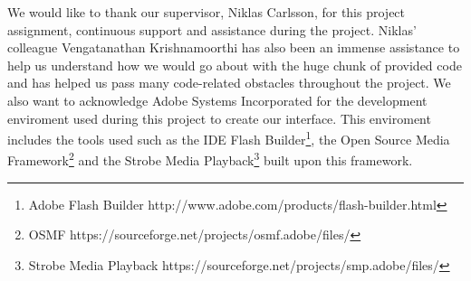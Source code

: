 We would like to thank our supervisor, Niklas Carlsson, for this project assignment, continuous support and assistance during the project. Niklas’ colleague Vengatanathan Krishnamoorthi has also been an immense assistance to help us understand how we would go about with the huge chunk of provided code and has helped us pass many code-related obstacles throughout the project. 
We also want to acknowledge Adobe Systems Incorporated for the development enviroment used during this project to create our interface. This enviroment includes the tools used such as the IDE Flash Builder\footnote{Adobe Flash Builder http://www.adobe.com/products/flash-builder.html}, the Open Source Media Framework\footnote{OSMF https://sourceforge.net/projects/osmf.adobe/files/} and the Strobe Media Playback\footnote{Strobe Media Playback https://sourceforge.net/projects/smp.adobe/files/} built upon this framework.
